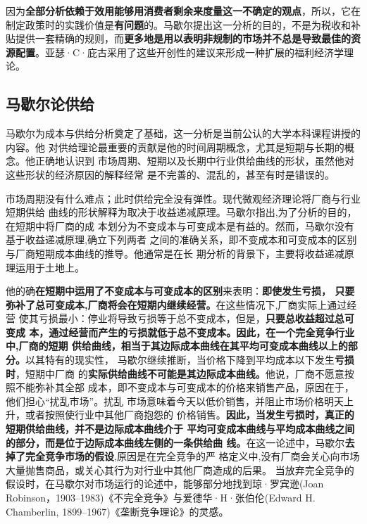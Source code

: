 因为\textbf{全部分析依赖于效用能够用消费者剩余来度量这一不确定的观点}，所以，它在
制定政策时的实践价值是\textbf{有问题}的。马歇尔提出这一分析的目的，不是为税收和补
贴提供一套精确的规则，而\textbf{更多地是用以表明非规制的市场并不总是导致最佳的资
  源配置}。亚瑟·C·庇古采用了这些开创性的建议来形成一种扩展的福利经济学理论。

\subsection{马歇尔论供给}

马歇尔为成本与供给分析奠定了基础，这一分析是当前公认的大学本科课程讲授的内容。他
对供给理论最重要的贡献是他的时间周期概念，尤其是短期与长期的概念。他正确地认识到
市场周期、短期以及长期中行业供给曲线的形状，虽然他对这些形状的经济原因的解释经常
是不完善的、混乱的，甚至有时是错误的。

市场周期没有什么难点；此时供给完全没有弹性。现代微观经济理论将厂商与行业短期供给
曲线的形状解释为取决于收益递减原理。马歇尔指出,为了分析的目的，在短期中将厂商的成
本划分为不变成本与可变成本是有益的。然而，马歇尔没有基于收益递减原理,确立下列两者
之间的准确关系，即不变成本和可变成本的区别与厂商短期成本曲线的推导。他通常是在长
期分析的背景下，主要将收益递减原理运用于土地上。

他的确\textbf{在短期中运用了不变成本与可变成本的区别}来表明：\textbf{即使发生亏损，
  只要弥补了总可变成本,厂商将会在短期内继续经营。}在这些情况下,厂商实际上通过经营
使其亏损最小：停业将导致亏损等于总不变成本，但是，\textbf{只要总收益超过总可变成
  本，通过经营而产生的亏损就低于总不变成本。因此，在一个完全竞争行业中,厂商的短期
  供给曲线，相当于其边际成本曲线在其平均可变成本曲线以上的部分。}以其特有的现实性，
马歇尔继续推断，当价格下降到平均成本以下发生\textbf{亏损时}，短期中厂商
的\textbf{实际供给曲线不可能是其边际成本曲线。}他说，厂商不愿意按照不能弥补其全部
成本，即不变成本与可变成本的价格来销售产品，原因在于，他们担心“扰乱市场”。扰乱
市场意味着今天以低价销售，并阻止市场价格明天上升，或者按照使行业中其他厂商抱怨的
价格销售。\textbf{因此，当发生亏损时，真正的短期供给曲线，并不是边际成本曲线介于
  平均可变成本曲线与平均成本曲线之间的部分，而是位于边际成本曲线左侧的一条供给曲
  线。}在这一论述中，马歇尔\textbf{去掉了完全竞争市场的假设},原因是在完全竞争的严
格定义中,没有厂商会关心向市场大量抛售商品，或关心其行为对行业中其他厂商造成的后果。
当放弃完全竞争的假设时，在马歇尔对市场运行的论述中，能够部分地找到琼·罗宾逊(Joan
Robinson，1903--1983)《不完全竞争》与爱德华·H·张伯伦(Edward H. Chamberlin,
1899--1967)《垄断竞争理论》的灵感。

